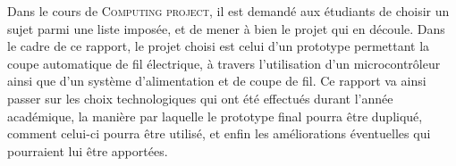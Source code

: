 Dans le cours de \textsc{Computing project}, il est demandé aux étudiants de choisir un sujet parmi une liste imposée, et de mener à bien le projet qui en découle. Dans le cadre de ce rapport, le projet choisi est celui d'un prototype permettant la coupe automatique de fil électrique, à travers l'utilisation d'un microcontrôleur ainsi que d'un système d'alimentation et de coupe de fil. Ce rapport va ainsi passer sur les choix technologiques qui ont été effectués durant l'année académique, la manière par laquelle le prototype final pourra être dupliqué, comment celui-ci pourra être utilisé, et enfin les améliorations éventuelles qui pourraient lui être apportées.